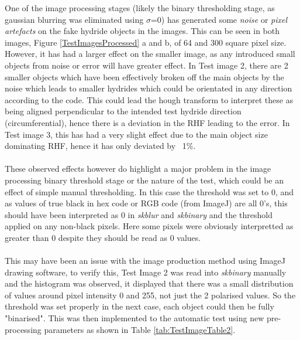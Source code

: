 \documentclass{article}
\begin{document}
    \noindent One of the image processing stages (likely the binary thresholding stage, as gaussian blurring was eliminated using $\sigma$=0) has generated some \textit{noise} or \textit{pixel artefacts} on the fake hydride objects in the images. This can be seen in both images, Figure \ref{TestImagesProcessed} a and b, of 64 and 300 square pixel size. However, it has had a larger effect on the smaller image, as any introduced small objects from noise or error will have greater effect. In Test image 2, there are 2 smaller objects which have been effectively broken off the main objects by the noise which leads to smaller hydrides which could be orientated in any direction according to the code. This could lead the hough transform to interpret these as being aligned perpendicular to the intended test hydride direction (circumferential), hence there is a deviation in the RHF leading to the error. In Test image 3, this has had a very slight effect due to the main object size dominating RHF, hence it has only deviated by ~1\%. 
    \\
    \\
    \noindent These observed effects however do highlight a major problem in the image processing binary threshold stage or the nature of the test, which could be an effect of simple manual thresholding. In this case the threshold was set to 0, and as values of true black in hex code or RGB code (from ImageJ) are all 0's, this should have been interpreted as 0 in \textit{skblur} and \textit{skbinary} and the threshold applied on any non-black pixels. Here some pixels were obviously interpretted as greater than 0 despite they should be read as 0 values. 
    \\
    \\
    This may have been an issue with the image production method using ImageJ drawing software, to verify this, Test Image 2 was read into \textit{skbinary} manually and the histogram was observed, it displayed that there was a small distribution of values around pixel intensity 0 and 255, not just the 2 polarised values. So the threshold was set properly in the next case, each object could then be fully "binarised". This was then implemented to the automatic test using new pre-processing parameters as shown in Table \ref{tab:TestImageTable2}.
    
\end{document}
